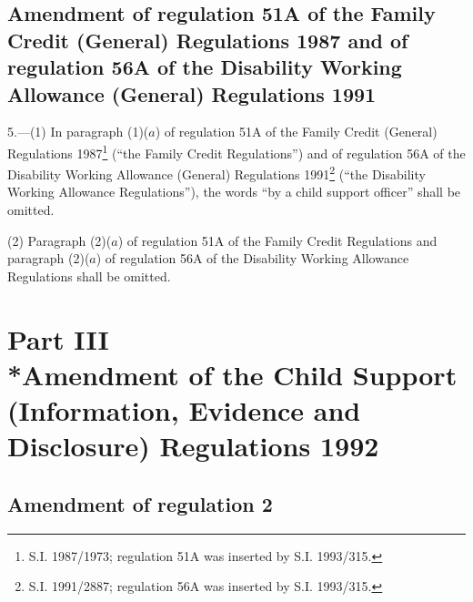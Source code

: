 \documentclass[12pt,a4paper]{article}
\begin{document}
\subsection[5. Amendment of regulation 51A of the Family Credit (General) Regulations 1987 and of regulation 56A of the Disability Working Allowance (General) Regulations 1991]{Amendment of regulation 51A of the Family Credit (General) Regulations 1987 and of regulation 56A of the Disability Working Allowance (General) Regulations 1991}

5.—(1) In paragraph (1)($a$) of regulation 51A of the Family Credit (General) Regulations 1987\footnote{\frenchspacing S.I. 1987/1973; regulation 51A was inserted by S.I. 1993/315.} (“the Family Credit Regulations”) and of regulation 56A of the Disability Working Allowance (General) Regulations 1991\footnote{\frenchspacing S.I. 1991/2887; regulation 56A was inserted by S.I. 1993/315.} (“the Disability Working Allowance Regulations”), the words “by a child support officer” shall be omitted.

(2) Paragraph (2)($a$) of regulation 51A of the Family Credit Regulations and paragraph (2)($a$) of regulation 56A of the Disability Working Allowance Regulations shall be omitted.

\section[Part III --- Amendment of the Child Support (Information, Evidence and Disclosure) Regulations 1992]{Part III\\*Amendment of the Child Support (Information, Evidence and Disclosure) Regulations 1992}

\renewcommand\parthead{--- Part III}

\subsection[6. Amendment of regulation 2]{Amendment of regulation 2}
\end{document}
